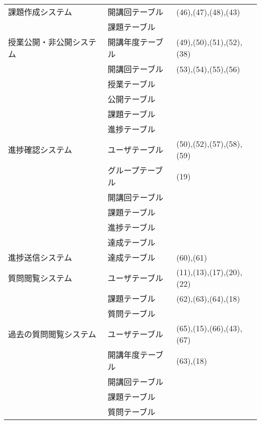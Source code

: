 \clearpage
                            \begin{table}[h]
                                \centering
                                \begin{tabular}{|l|l|l|}
                                \hline
    課題作成システム & 開講回テーブル & (46),(47),(48),(43)\\ \cline{2-2}
                  & 課題テーブル & \\ \hline
    授業公開・非公開システム & 開講年度テーブル & (49),(50),(51),(52),(38)\\ \cline{2-2}
                        & 開講回テーブル & (53),(54),(55),(56)\\ \cline{2-2}
                        & 授業テーブル & \\ \cline{2-2}
                        & 公開テーブル & \\ \cline{2-2}
                        & 課題テーブル & \\ \cline{2-2}
                        & 進捗テーブル & \\ \hline
    進捗確認システム & ユーザテーブル & (50),(52),(57),(58),(59)\\ \cline{2-2}
                  & グループテーブル & (19)\\ \cline{2-2}
                  & 開講回テーブル & \\ \cline{2-2}
                  & 課題テーブル & \\ \cline{2-2}
                  & 進捗テーブル & \\ \cline{2-2}
                  & 達成テーブル & \\ \hline
    進捗送信システム & 達成テーブル & (60),(61)\\ \hline
    質問閲覧システム & ユーザテーブル & (11),(13),(17),(20),(22)\\ \cline{2-2}
                  & 課題テーブル & (62),(63),(64),(18)\\ \cline{2-2}
                  & 質問テーブル & \\ \hline
    過去の質問閲覧システム & ユーザテーブル & (65),(15),(66),(43),(67)\\ \cline{2-2}
                        & 開講年度テーブル & (63),(18)\\ \cline{2-2}
                        & 開講回テーブル  & \\ \cline{2-2}
                        & 課題テーブル & \\ \cline{2-2}
                        & 質問テーブル & \\ \hline

\end{tabular}
\end{table}
